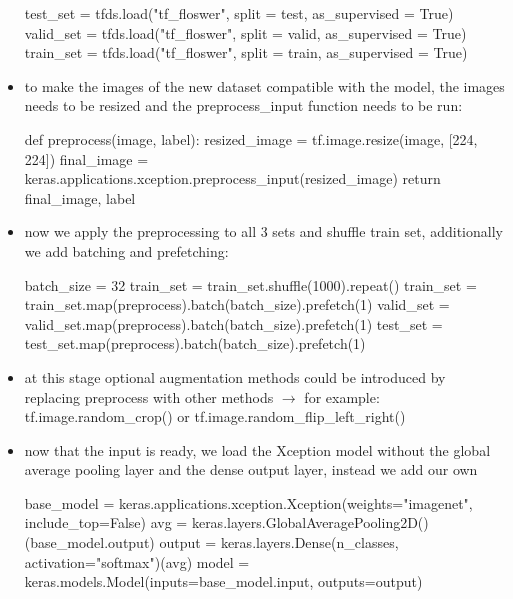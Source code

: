 \documentclass[12pt,a4paper]{article}
\begin{document}
\begin{itemize}
\begin{python}
    test_set = tfds.load("tf_floswer", split = test, as_supervised = True)
    valid_set = tfds.load("tf_floswer", split = valid, as_supervised = True)
    train_set = tfds.load("tf_floswer", split = train, as_supervised = True) 
  \end{python}
  \item to make the images of the new dataset compatible with the model, the images  needs to be resized and the preprocess\_input function needs to be run:
  \begin{python}
    def preprocess(image, label):
        resized_image = tf.image.resize(image, [224, 224])
        final_image = keras.applications.xception.preprocess_input(resized_image)
        return final_image, label
  \end{python}
  \item now we apply the preprocessing to all 3 sets and shuffle train set, additionally we add batching and prefetching:
  \begin{python}
    batch_size = 32
    train_set = train_set.shuffle(1000).repeat()
    train_set = train_set.map(preprocess).batch(batch_size).prefetch(1)
    valid_set = valid_set.map(preprocess).batch(batch_size).prefetch(1)
    test_set = test_set.map(preprocess).batch(batch_size).prefetch(1)
  \end{python}
  \item at this stage optional augmentation methods could be introduced by replacing preprocess with other methods
  \newline \indent $\longrightarrow$ for example: tf.image.random\_crop() or tf.image.random\_flip\_left\_right()
  \item now that the input is ready, we load the Xception model without the global average pooling layer and the dense output layer, instead we add our own
  \begin{python}
    base_model = keras.applications.xception.Xception(weights="imagenet",
                                                      include_top=False)
    avg = keras.layers.GlobalAveragePooling2D()(base_model.output)
    output = keras.layers.Dense(n_classes, activation="softmax")(avg)
    model = keras.models.Model(inputs=base_model.input, outputs=output)


\end{python}
\end{itemize}
\end{document}
